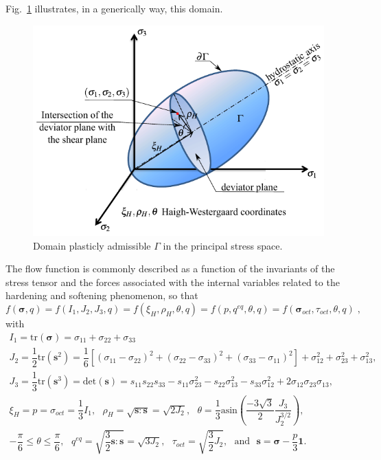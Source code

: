 \documentclass[Journal,letterpaper]{ascelike-new}
\newcommand{\sll}{\boldsymbol{s}}
\newcommand{\onell}{\boldsymbol{1}}
\newcommand{\stress}{\boldsymbol{\sigma}}
\begin{document}
Fig.~\ref{fig-PA-domain} illustrates, in a generically way, this domain.
\begin{figure}
\centering
\includegraphics[scale=1]{PA-domain.pdf}
\caption{Domain plasticly admissible $\Gamma$ in the principal stress space.}
\label{fig-PA-domain}
\end{figure}

The flow function is commonly described as a function of the invariants of the stress tensor and the forces associated with the internal variables related to the hardening and softening phenomenon, so that
\begin{equation} \label{eq_flow_function_representation}
	f(\stress,q) = f(I_1,J_2,J_3,q) = f(\xi_{H},\rho_{H},\theta,q) = f(p,q^{eq},\theta,q) = f(\stress_{oct},\tau_{oct},\theta,q)\;,
\end{equation}
with
\begin{equation} \label{eq_invariants_elements}
	\begin{array}{lcl}
		I_1 = \text{tr}(\stress) = \sigma_{11}+\sigma_{22}+\sigma_{33}\\
		J_2 = \dfrac{1}{2}\text{tr}(\sll^2) = \dfrac{1}{6}\left[ (\sigma_{11}-\sigma_{22})^2 + (\sigma_{22}-\sigma_{33})^2 + (\sigma_{33}-\sigma_{11})^2 \right] + \sigma_{12}^2+ \sigma_{23}^2+ \sigma_{13}^2, \\
		J_3 = \dfrac{1}{3}\text{tr}(\sll^3) = \text{det}(\sll) = s_{11}s_{22}s_{33}-s_{11}\sigma_{23}^2-s_{22}\sigma_{13}^2-s_{33}\sigma_{12}^2+2\sigma_{12}\sigma_{23}\sigma_{13}, \\ 
		\xi_{H} = p = \sigma_{oct} = \dfrac{1}{3}I_1, ~~~ \rho_{H} = \sqrt{\sll:\sll} = \sqrt{2J_2}, ~~~ \theta = \dfrac{1}{3}\text{asin}\left( \dfrac{-3\sqrt{3}}{2} \dfrac{J_3}{J_2^{3/2}} \right), \\
		-\dfrac{\pi}{6} \le \theta \le \dfrac{\pi}{6}, ~~~q^{eq} = \sqrt{\dfrac{3}{2}\sll:\sll} = \sqrt{3J_2}, ~~~\tau_{oct} = \sqrt{\dfrac{3}{2}J_2},~~~\text{and}~~~\sll = \stress - \dfrac{p}{3}\onell.
	\end{array}\;
\end{equation}
\end{document}
